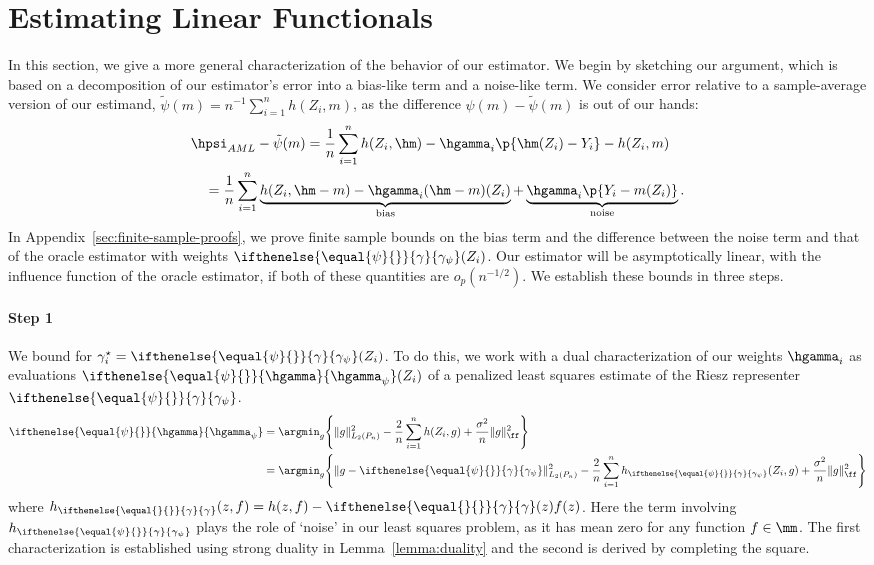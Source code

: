 \documentclass[aos,submission]{imsart}
\theoremstyle{plain}
\theoremstyle{remark}
\newcommand{\tpsi}{\tilde{\psi}}
\newcommand{\riesz}[1][]{\ifthenelse{\equal{#1}{}}{\gamma}{\gamma_{{#1}}}}
\newcommand{\hriesz}[1][]{\ifthenelse{\equal{#1}{}}{\hgamma}{\hgamma_{{#1}}}}
\DeclarePairedDelimiter\norm{\lVert}{\rVert}
\DeclarePairedDelimiter\set{\{}{\}}
\begin{document}
\section{Estimating Linear Functionals}
\label{sec:estimating-linear-functionals}

In this section, we give a more general characterization of the behavior of our estimator. We begin by sketching our argument, 
which is based on a decomposition of our estimator's error into a bias-like term and a noise-like term. 
We consider error relative to a sample-average version of our estimand, $\tilde{\psi}(m) = n^{-1}\sum_{i=1}^n h(Z_i,m)$,
as the difference $\psi(m)-\tpsi(m)$ is out of our hands:
\begin{equation}
 \label{eq:error-decomp}
\begin{split}
&\hpsi_{AML} - \tilde{\psi}(m)  
= \frac{1}{n}\sum_{i=1}^n h(Z_i, \hm) - \hgamma_i \p{\hm(Z_i) - Y_i} - h(Z_i, m)  \\
&\quad = \frac{1}{n}\sum_{i=1}^n \underbrace{h(Z_i,\hm-m) - \hgamma_i (\hm-m)(Z_i)}_{\text{bias}} 
  + \underbrace{\hgamma_i \p{Y_i - m(Z_i)}}_{\text{noise}}.
\end{split}
\end{equation}
In Appendix~\ref{sec:finite-sample-proofs}, we prove finite sample bounds on the bias term and 
the difference between the noise term and that of the oracle estimator with weights $\riesz[\psi](Z_i)$.
Our estimator will be asymptotically linear, with the influence function of the oracle estimator,
if both of these quantities are $o_p(n^{-1/2})$. We establish these bounds in three steps.

\paragraph*{Step 1}
We bound  for $\gamma^{\star}_i = \riesz[\psi](Z_i)$.
To do this,  we work with a dual characterization of our weights $\hgamma_i$ as evaluations $\hriesz[\psi](Z_i)$ of a penalized least squares estimate
of the Riesz representer $\riesz[\psi]$. 
\begin{equation}
\label{eq:dual}
\begin{split}
\hriesz[\psi] &= \argmin_{g} \set*{ \norm{g}_{L_2(\Pn)}^2 - \frac{2}{n}\sum_{i=1}^n h(Z_i, g) + \frac{\sigma^2}{n}\norm{g}_{\ff}^2 } \\
	      &= \argmin_{g} \set*{  \norm{g - \riesz[\psi]}_{L_2(\Pn)}^2 - \frac{2}{n}\sum_{i=1}^n h_{\riesz[\psi]}(Z_i, g) + \frac{\sigma^2}{n}\norm{g}_{\ff}^2}
\end{split}
\end{equation}
where $h_{\riesz}(z,f) = h(z,f) - \riesz(z)f(z)$. Here the term involving $h_{\riesz[\psi]}$ plays the role of `noise' in our least squares problem, 
as it has mean zero for any function $f \in \mm$. The first characterization is established using strong duality in Lemma~\ref{lemma:duality}
and the second is derived by completing the square.
\end{document}
